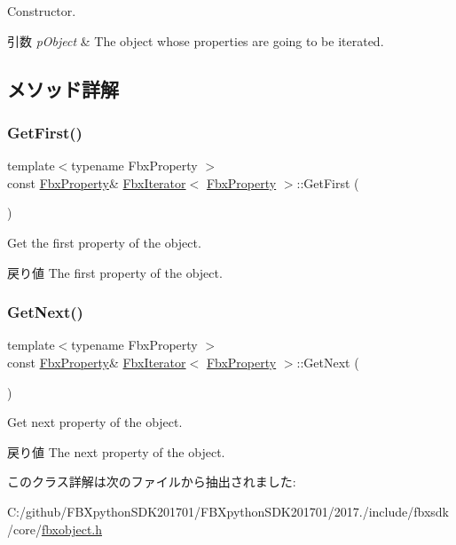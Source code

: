 Constructor. 
\begin{DoxyParams}{引数}
{\em p\+Object} & The object whose properties are going to be iterated. \\
\hline
\end{DoxyParams}


\subsection{メソッド詳解}
\mbox{\label{class_fbx_iterator_a3ebfa1d0238b2b13c9163a26c0687cb2}} 
\subsubsection{\texorpdfstring{Get\+First()}{GetFirst()}}
{\footnotesize\ttfamily template$<$typename Fbx\+Property $>$ \\
const \hyperlink{class_fbx_property}{Fbx\+Property}\& \hyperlink{class_fbx_iterator}{Fbx\+Iterator}$<$ \hyperlink{class_fbx_property}{Fbx\+Property} $>$\+::Get\+First (\begin{DoxyParamCaption}{ }\end{DoxyParamCaption})}

Get the first property of the object. \begin{DoxyReturn}{戻り値}
The first property of the object. 
\end{DoxyReturn}
\mbox{\label{class_fbx_iterator_a73f4bbaedea5a2f646d2195877eedd17}} 
\subsubsection{\texorpdfstring{Get\+Next()}{GetNext()}}
{\footnotesize\ttfamily template$<$typename Fbx\+Property $>$ \\
const \hyperlink{class_fbx_property}{Fbx\+Property}\& \hyperlink{class_fbx_iterator}{Fbx\+Iterator}$<$ \hyperlink{class_fbx_property}{Fbx\+Property} $>$\+::Get\+Next (\begin{DoxyParamCaption}{ }\end{DoxyParamCaption})}

Get next property of the object. \begin{DoxyReturn}{戻り値}
The next property of the object. 
\end{DoxyReturn}


このクラス詳解は次のファイルから抽出されました\+:\begin{DoxyCompactItemize}
\item 
C\+:/github/\+F\+B\+Xpython\+S\+D\+K201701/\+F\+B\+Xpython\+S\+D\+K201701/2017./include/fbxsdk/core/\hyperlink{fbxobject_8h}{fbxobject.\+h}\end{DoxyCompactItemize}
